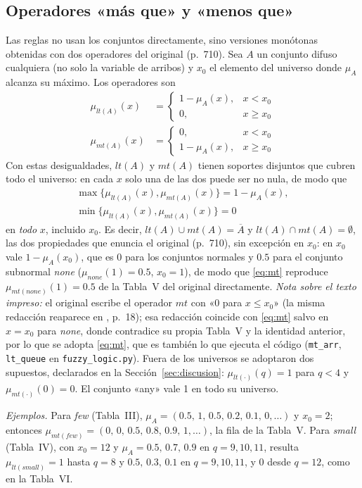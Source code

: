 \documentclass[journal]{IEEEtran}
\begin{document}
\subsection{Operadores «más que» y «menos que»}
\label{ap:mtlt}
Las reglas no usan los conjuntos directamente, sino versiones monótonas obtenidas con dos operadores del original (p.~710). Sea $A$ un conjunto difuso cualquiera (no solo la variable de arribos) y $x_0$ el elemento del universo donde $\mu_A$ alcanza su máximo. Los operadores son
\begin{align}
\mu_{lt(A)}(x)&=\begin{cases}1-\mu_A(x), & x<x_0\\ 0, & x\ge x_0\end{cases} \label{eq:lt}\\
\mu_{mt(A)}(x)&=\begin{cases}0, & x<x_0\\ 1-\mu_A(x), & x\ge x_0\end{cases} \label{eq:mt}
\end{align}
Con estas desigualdades, $lt(A)$ y $mt(A)$ tienen soportes disjuntos que cubren todo el universo: en cada $x$ solo una de las dos puede ser no nula, de modo que
\begin{gather*}
\max\{\mu_{lt(A)}(x),\mu_{mt(A)}(x)\}=1-\mu_A(x),\\
\min\{\mu_{lt(A)}(x),\mu_{mt(A)}(x)\}=0
\end{gather*}
en \emph{todo} $x$, incluido $x_0$. Es decir, $lt(A)\cup mt(A)=\overline{A}$ y $lt(A)\cap mt(A)=\emptyset$, las dos propiedades que enuncia el original (p.~710), sin excepción en $x_0$: en $x_0$ vale $1-\mu_A(x_0)$, que es $0$ para los conjuntos normales y $0.5$ para el conjunto subnormal \emph{none} ($\mu_{none}(1)=0.5$, $x_0=1$), de modo que \eqref{eq:mt} reproduce $\mu_{mt(none)}(1)=0.5$ de la Tabla~V del original directamente. \emph{Nota sobre el texto impreso:} el original escribe el operador $mt$ con «$0$ para $x\le x_0$» (la misma redacción reaparece en \cite{Niittymaki2000}, p.~18); esa redacción coincide con \eqref{eq:mt} salvo en $x=x_0$ para \emph{none}, donde contradice su propia Tabla~V y la identidad anterior, por lo que se adopta \eqref{eq:mt}, que es también lo que ejecuta el código (\texttt{mt\_arr}, \texttt{lt\_queue} en \texttt{fuzzy\_logic.py}). Fuera de los universos se adoptaron dos supuestos, declarados en la Sección~\ref{sec:discusion}: $\mu_{lt(\cdot)}(q)=1$ para $q<4$ y $\mu_{mt(\cdot)}(0)=0$. El conjunto «any» vale 1 en todo su universo.

\emph{Ejemplos.} Para \emph{few} (Tabla~III), $\mu_A=(0.5,\,1,\,0.5,\,0.2,\,0.1,\,0,\dots)$ y $x_0=2$; entonces $\mu_{mt(few)}=(0,\,0,\,0.5,\,0.8,\,0.9,\,1,\dots)$, la fila de la Tabla~V. Para \emph{small} (Tabla~IV), con $x_0=12$ y $\mu_A=0.5,\,0.7,\,0.9$ en $q=9,10,11$, resulta $\mu_{lt(small)}=1$ hasta $q=8$ y $0.5,\,0.3,\,0.1$ en $q=9,10,11$, y $0$ desde $q=12$, como en la Tabla~VI.
\end{document}
